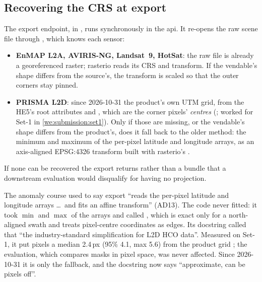 \subsection{Recovering the CRS at export}

The export endpoint,  in ,
runs synchronously in the api. It re-opens the raw scene file through ,
which knows each sensor:
\begin{itemize}
\item \textbf{EnMAP L2A, AVIRIS-NG, Landsat~9, HotSat}: the raw file is already a georeferenced raster;
  rasterio reads its CRS and transform. If the vendable's shape differs from the source's, the transform is
  scaled so that the outer corners stay pinned.
\item \textbf{PRISMA L2D}: since 2026-10-31 the product's own UTM grid, from the HE5's root attributes
   and , which are the corner pixels'
  \emph{centres} (; worked for Set-1 in \cref{we:submission:set1}). Only if those are
  missing, or the vendable's shape differs from the product's, does it fall back to the older method: the minimum and
  maximum of the per-pixel latitude and longitude arrays, as an axis-aligned EPSG:4326 transform built with
  rasterio's .
\end{itemize}
If none can be recovered the export returns  rather than a bundle that a downstream
evaluation would disqualify for having no projection.

\begin{sourcenote}
The anomaly course used to say export ``reads the per-pixel latitude and longitude arrays \dots\ and fits an affine
transform'' (AD13). The code never fitted: it took $\min$ and $\max$ of the arrays and called
, which is exact only for a north-aligned swath and treats
pixel-centre coordinates as edges. Its docstring called that ``the industry-standard simplification for L2D HCO data''.
Measured on Set-1, it put pixels a median 2.4\,px (95\% 4.1, max 5.6) from the product grid
; the evaluation, which compares masks in pixel space, was never
affected. Since 2026-10-31 it is only the fallback, and the docstring now says ``approximate, can be pixels off''.
\end{sourcenote}

